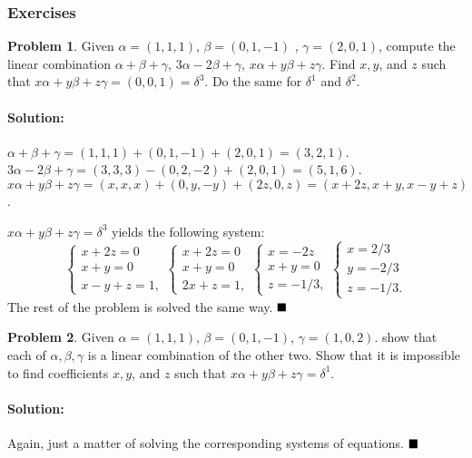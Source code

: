 \documentclass[]{article}
\theoremstyle{definition}
\newtheorem{problem}{Problem}
\newenvironment{solution}{\paragraph{Solution:}}{\hfill$\blacksquare \\$}
\begin{document}
\subsubsection{Exercises}
\begin{problem} Given  $ \alpha = (1,1,1) $,  $ \beta = (0,1,-1) $  ,  $ \gamma = (2,0,1) $, compute the linear combination  $ \alpha + \beta + \gamma$, $3\alpha - 2\beta + \gamma$, $x\alpha + y\beta + z\gamma $. Find  $ x,y $, and  $ z $  such that  $ x\alpha + y\beta + z\gamma = (0,0,1) = \delta^3$. Do the same for  $ \delta^1 $  and  $ \delta^2 $.      
\end{problem}
\begin{solution}
	$\alpha + \beta + \gamma = (1,1,1) + (0, 1, -1) + (2,0,1) = (3, 2, 1)$. \\
	$3\alpha - 2\beta + \gamma = (3,3,3) - (0,2,-2) + (2,0,1) = (5, 1, 6)$. \\
	$x\alpha + y\beta + z\gamma = (x,x,x) + (0, y, -y) + (2z, 0, z) = (x+2z, x+y, x-y+z)$. \par
	$x\alpha + y \beta + z \gamma = \delta^3$ yields the following system:
	\[
	\begin{cases}
		x+2z = 0 \\
		x+y = 0 \\
		x-y+z = 1 , 
	\end{cases}
	\begin{cases} 
		x+2z = 0 \\
		x + y = 0 \\
		2x + z = 1,
	\end{cases}
	\begin{cases}
		x = -2z \\
		x + y = 0 \\
		z = -1/3,
	\end{cases}
	\begin{cases}
		x = 2/3 \\
		y = -2/3 \\
		z = - 1/3.
	\end{cases}

\]
The rest of the problem is solved the same way.
\end{solution}
\begin{problem}
	Given  $\alpha = (1,1,1)$,  $\beta = (0,1,-1)$,  $\gamma = (1,0,2)$. show that each of  $\alpha, \beta, \gamma$ is a linear combination of the other two. Show that it is impossible to find coefficients  $x, y$, and  $z$  such that  $x\alpha + y\beta +  z\gamma = \delta^1$.          	
\end{problem}
\begin{solution}
	Again, just a matter of solving the corresponding systems of equations.
\end{solution}
\end{document}
